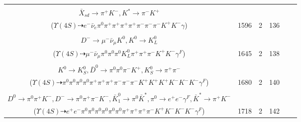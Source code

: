 \documentclass[landscape]{article}
\newcounter{rownumbers}
\newcommand\rn{\stepcounter{rownumbers}\arabic{rownumbers}}
\newcommand{\EOLP}{\\ \hline} %
\newcommand{\topoTags}[1]{#1} %
\begin{document}
\begin{longtable}{clcccc}
\rn & \makecell[l]{ $ 
\Upsilon(4S) \rightarrow B^{0} \bar{B}^{0} ,
B^{0} \rightarrow \rho^{0} \pi^{+} \pi^{-} \rho^{+} D^{-} ,
\bar{B}^{0} \rightarrow \bar{X}_{sd} \gamma ,
\rho^{0} \rightarrow \pi^{+} \pi^{-} ,
\rho^{+} \rightarrow \pi^{0} \pi^{+} ,
D^{-} \rightarrow e^{-} \bar{\nu}_{e} K^{*} ,
$ \\ $
\bar{X}_{sd} \rightarrow \pi^{+} K^{-} ,
K^{*} \rightarrow \pi^{-} K^{+} 
$ \\ ($
\Upsilon(4S) \dashrightarrow e^{-} \bar{\nu}_{e} \pi^{0} \pi^{+} \pi^{+} \pi^{+} \pi^{+} \pi^{-} \pi^{-} \pi^{-} K^{+} K^{-} \gamma 
$) } & \topoTags{1596 & }2 & 136 \EOLP

\rn & \makecell[l]{ $ 
\Upsilon(4S) \rightarrow B^{0} \bar{B}^{0} ,
B^{0} \rightarrow D^{*-} a_{1}^{+} ,
\bar{B}^{0} \rightarrow \pi^{0} D^{0} ,
D^{*-} \rightarrow \pi^{0} D^{-} ,
a_{1}^{+} \rightarrow \pi^{+} \pi^{+} \pi^{-} \gamma^{F} ,
D^{0} \rightarrow \pi^{0} K^{+} K^{-} ,
$ \\ $
D^{-} \rightarrow \mu^{-} \bar{\nu}_{\mu} K^{0} ,
K^{0} \rightarrow K_{L}^{0} 
$ \\ ($
\Upsilon(4S) \dashrightarrow \mu^{-} \bar{\nu}_{\mu} \pi^{0} \pi^{0} \pi^{0} K_{L}^{0} \pi^{+} \pi^{+} \pi^{-} K^{+} K^{-} \gamma^{F} 
$) } & \topoTags{1645 & }2 & 138 \EOLP

\rn & \makecell[l]{ $ 
\Upsilon(4S) \rightarrow B^{0} \bar{B}^{0} ,
B^{0} \rightarrow \pi^{0} K^{+} K^{+} K^{-} K^{-} K^{*+} D^{*-} ,
\bar{B}^{0} \rightarrow \rho^{+} K^{-} ,
K^{*+} \rightarrow \pi^{+} K^{0} ,
D^{*-} \rightarrow \pi^{-} \bar{D}^{0} ,
\rho^{+} \rightarrow \pi^{0} \pi^{+} \gamma^{F} ,
$ \\ $
K^{0} \rightarrow K_{S}^{0} ,
\bar{D}^{0} \rightarrow \pi^{0} \pi^{0} \pi^{-} K^{+} ,
K_{S}^{0} \rightarrow \pi^{+} \pi^{-} 
$ \\ ($
\Upsilon(4S) \dashrightarrow \pi^{0} \pi^{0} \pi^{0} \pi^{0} \pi^{+} \pi^{+} \pi^{+} \pi^{-} \pi^{-} \pi^{-} K^{+} K^{+} K^{+} K^{-} K^{-} K^{-} \gamma^{F} 
$) } & \topoTags{1680 & }2 & 140 \EOLP

\rn & \makecell[l]{ $ 
\Upsilon(4S) \rightarrow B^{0} \bar{B}^{0} ,
B^{0} \rightarrow K^{*+} D^{*-} D^{0} ,
\bar{B}^{0} \rightarrow \pi^{0} D^{0} ,
K^{*+} \rightarrow \pi^{0} K^{+} ,
D^{*-} \rightarrow \pi^{0} D^{-} ,
D^{0} \rightarrow \pi^{0} \bar{K}_1^{0} ,
$ \\ $
D^{0} \rightarrow \pi^{0} \pi^{+} K^{-} ,
D^{-} \rightarrow \pi^{0} \pi^{+} \pi^{-} K^{-} ,
\bar{K}_1^{0} \rightarrow \pi^{0} \bar{K}^{*} ,
\pi^{0} \rightarrow e^{+} e^{-} \gamma^{F} ,
\bar{K}^{*} \rightarrow \pi^{+} K^{-} 
$ \\ ($
\Upsilon(4S) \dashrightarrow e^{+} e^{-} \pi^{0} \pi^{0} \pi^{0} \pi^{0} \pi^{0} \pi^{0} \pi^{+} \pi^{+} \pi^{+} \pi^{-} K^{+} K^{-} K^{-} K^{-} \gamma^{F} 
$) } & \topoTags{1718 & }2 & 142 \EOLP


\end{longtable}
\end{document}
